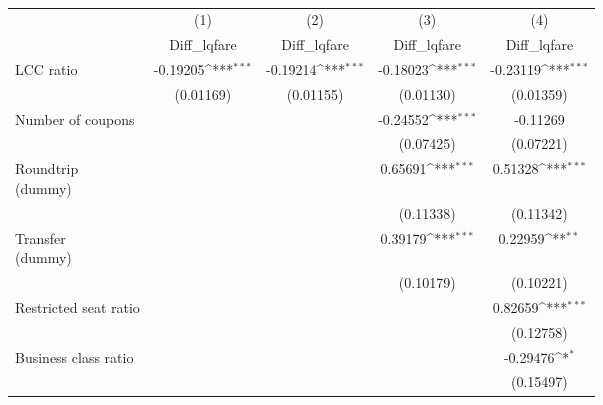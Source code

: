\begin{table}[htbp]\centering
\def\sym#1{\ifmmode^{#1}\else\(^{#1}\)\fi}
\caption{ \label{asvxfd}}
\begin{tabular}{l*{4}{c}}
\toprule
                    &\multicolumn{1}{c}{(1)}&\multicolumn{1}{c}{(2)}&\multicolumn{1}{c}{(3)}&\multicolumn{1}{c}{(4)}\\
                    &\multicolumn{1}{c}{Diff\_lqfare}&\multicolumn{1}{c}{Diff\_lqfare}&\multicolumn{1}{c}{Diff\_lqfare}&\multicolumn{1}{c}{Diff\_lqfare}\\
\midrule
LCC ratio           &    -0.19205\sym{***}&    -0.19214\sym{***}&    -0.18023\sym{***}&    -0.23119\sym{***}\\
                    &   (0.01169)         &   (0.01155)         &   (0.01130)         &   (0.01359)         \\
\addlinespace
Number of coupons   &                     &                     &    -0.24552\sym{***}&    -0.11269         \\
                    &                     &                     &   (0.07425)         &   (0.07221)         \\
\addlinespace
\Centerstack{Roundtrip \\ (dummy)}&                     &                     &     0.65691\sym{***}&     0.51328\sym{***}\\
                    &                     &                     &   (0.11338)         &   (0.11342)         \\
\addlinespace
\Centerstack{Transfer \\ (dummy)}&                     &                     &     0.39179\sym{***}&     0.22959\sym{**} \\
                    &                     &                     &   (0.10179)         &   (0.10221)         \\
\addlinespace
Restricted seat ratio&                     &                     &                     &     0.82659\sym{***}\\
                    &                     &                     &                     &   (0.12758)         \\
\addlinespace
Business class ratio&                     &                     &                     &    -0.29476\sym{*}  \\
                    &                     &                     &                     &   (0.15497)         \\

\end{tabular}
\end{table}
